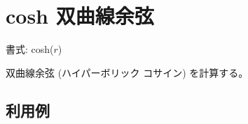 
%

\section{cosh 双曲線余弦\label{sect:cosh}}

書式: cosh($r$)

双曲線余弦 (ハイパーボリック コサイン) を計算する。

\subsection*{利用例}


%


